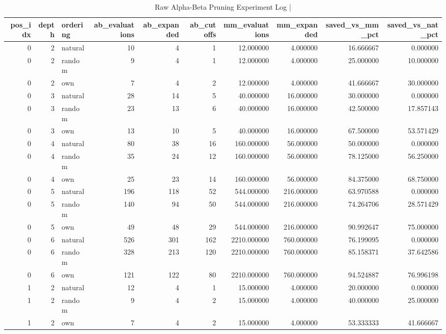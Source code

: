 \begin{table}[htbp]
\centering
\caption{Raw Alpha-Beta Pruning Experiment Log | \stampline}
\label{tab:partC_pruning_raw}
\begin{tabular}{rrlrrrrrrr}
\toprule
pos\_idx & depth & ordering & ab\_evaluations & ab\_expanded & ab\_cutoffs & mm\_evaluations & mm\_expanded & saved\_vs\_mm\_pct & saved\_vs\_nat\_pct \\
\midrule
0 & 2 & natural & 10 & 4 & 1 & 12.000000 & 4.000000 & 16.666667 & 0.000000 \\
0 & 2 & random & 9 & 4 & 1 & 12.000000 & 4.000000 & 25.000000 & 10.000000 \\
0 & 2 & own & 7 & 4 & 2 & 12.000000 & 4.000000 & 41.666667 & 30.000000 \\
0 & 3 & natural & 28 & 14 & 5 & 40.000000 & 16.000000 & 30.000000 & 0.000000 \\
0 & 3 & random & 23 & 13 & 6 & 40.000000 & 16.000000 & 42.500000 & 17.857143 \\
0 & 3 & own & 13 & 10 & 5 & 40.000000 & 16.000000 & 67.500000 & 53.571429 \\
0 & 4 & natural & 80 & 38 & 16 & 160.000000 & 56.000000 & 50.000000 & 0.000000 \\
0 & 4 & random & 35 & 24 & 12 & 160.000000 & 56.000000 & 78.125000 & 56.250000 \\
0 & 4 & own & 25 & 23 & 14 & 160.000000 & 56.000000 & 84.375000 & 68.750000 \\
0 & 5 & natural & 196 & 118 & 52 & 544.000000 & 216.000000 & 63.970588 & 0.000000 \\
0 & 5 & random & 140 & 94 & 50 & 544.000000 & 216.000000 & 74.264706 & 28.571429 \\
0 & 5 & own & 49 & 48 & 29 & 544.000000 & 216.000000 & 90.992647 & 75.000000 \\
0 & 6 & natural & 526 & 301 & 162 & 2210.000000 & 760.000000 & 76.199095 & 0.000000 \\
0 & 6 & random & 328 & 213 & 120 & 2210.000000 & 760.000000 & 85.158371 & 37.642586 \\
0 & 6 & own & 121 & 122 & 80 & 2210.000000 & 760.000000 & 94.524887 & 76.996198 \\
1 & 2 & natural & 12 & 4 & 1 & 15.000000 & 4.000000 & 20.000000 & 0.000000 \\
1 & 2 & random & 9 & 4 & 2 & 15.000000 & 4.000000 & 40.000000 & 25.000000 \\
1 & 2 & own & 7 & 4 & 2 & 15.000000 & 4.000000 & 53.333333 & 41.666667 \\

\end{tabular}
\end{table}
